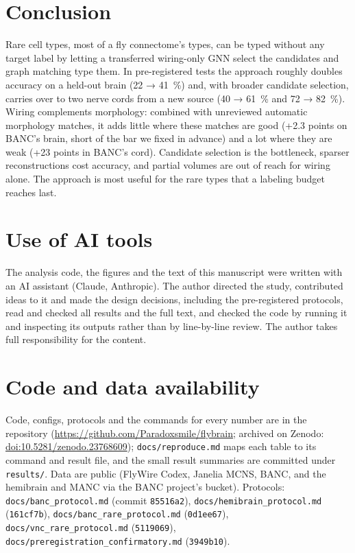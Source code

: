 \documentclass[11pt,a4paper]{article}
\begin{document}
\section{Conclusion}

Rare cell types, most of a fly connectome's types, can be typed without any target label by letting a transferred wiring-only GNN select the candidates and graph matching type them. In pre-registered tests the approach roughly doubles accuracy on a held-out brain (22 → 41~\%) and, with broader candidate selection, carries over to two nerve cords from a new source (40 → 61~\% and 72 → 82~\%). Wiring complements morphology: combined with unreviewed automatic morphology matches, it adds little where these matches are good (+2.3 points on BANC's brain, short of the bar we fixed in advance) and a lot where they are weak (+23 points in BANC's cord). Candidate selection is the bottleneck, sparser reconstructions cost accuracy, and partial volumes are out of reach for wiring alone. The approach is most useful for the rare types that a labeling budget reaches last.

\section*{Use of AI tools}

The analysis code, the figures and the text of this manuscript were written with an AI assistant (Claude, Anthropic). The author directed the study, contributed ideas to it and made the design decisions, including the pre-registered protocols, read and checked all results and the full text, and checked the code by running it and inspecting its outputs rather than by line-by-line review. The author takes full responsibility for the content.

\section*{Code and data availability}

Code, configs, protocols and the commands for every number are in the repository (\url{https://github.com/Paradoxsmile/flybrain}; archived on Zenodo: \href{https://doi.org/10.5281/zenodo.23768609}{doi:10.5281/zenodo.23768609}); \texttt{docs/\allowbreak{}reproduce.md} maps each table to its command and result file, and the small result summaries are committed under \texttt{results/\allowbreak{}}. Data are public (FlyWire Codex, Janelia MCNS, BANC, and the hemibrain and MANC via the BANC project's bucket). Protocols: \texttt{docs/\allowbreak{}banc\_\allowbreak{}protocol.md} (commit \texttt{85516a2}), \texttt{docs/\allowbreak{}hemibrain\_\allowbreak{}protocol.md} (\texttt{161cf7b}), \texttt{docs/\allowbreak{}banc\_\allowbreak{}rare\_\allowbreak{}protocol.md} (\texttt{0d1ee67}), \texttt{docs/\allowbreak{}vnc\_\allowbreak{}rare\_\allowbreak{}protocol.md} (\texttt{5119069}), \texttt{docs/\allowbreak{}preregistration\_\allowbreak{}confirmatory.md} (\texttt{3949b10}).
\end{document}

